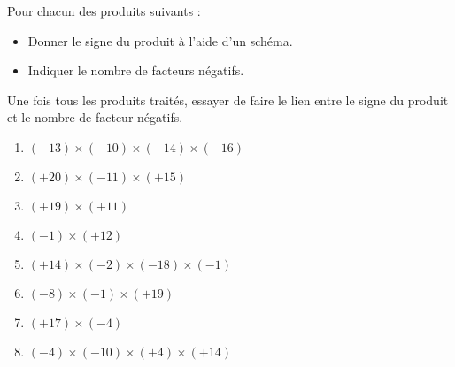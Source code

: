 \begin{exercice*}
    Pour chacun des produits suivants :
    \begin{itemize}
        \item Donner le signe du produit à l'aide d'un schéma.
        \item Indiquer le nombre de facteurs négatifs.
    \end{itemize}
    Une fois tous les produits traités, essayer de faire le lien entre le signe du produit et le nombre de facteur négatifs.
    \begin{enumerate}
        \item $ (-13) \times (-10) \times (-14) \times (-16) $
        \item $ (+20) \times (-11) \times (+15) $
        \item $ (+19) \times (+11) $
        \item $ (-1) \times (+12) $
        \item $ (+14) \times (-2) \times (-18) \times (-1) $
        \item $ (-8) \times (-1) \times (+19) $
        \item $ (+17) \times (-4) $
        \item $ (-4) \times (-10) \times (+4) \times (+14) $
    \end{enumerate}    
\end{exercice*}
